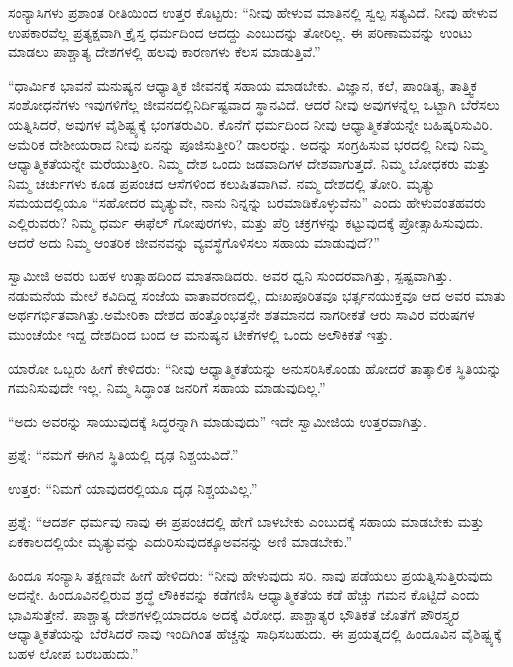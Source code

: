 ಸಂನ್ಯಾಸಿಗಳು ಪ್ರಶಾಂತ ರೀತಿಯಿಂದ ಉತ್ತರ ಕೊಟ್ಟರು: “ನೀವು ಹೇಳುವ ಮಾತಿನಲ್ಲಿ ಸ್ವಲ್ಪ ಸತ್ಯವಿದೆ. ನೀವು ಹೇಳುವ ಉಪಕಾರವೆಲ್ಲ ಪ್ರತ್ಯಕ್ಷವಾಗಿ ಕ್ರೈಸ್ತ ಧರ್ಮದಿಂದ ಆದದ್ದು ಎಂಬುದನ್ನು ತೋರಿಲ್ಲ. ಈ ಪರಿಣಾಮವನ್ನು ಉಂಟು ಮಾಡಲು ಪಾಶ್ಚಾತ್ಯ ದೇಶಗಳಲ್ಲಿ ಹಲವು ಕಾರಣಗಳು ಕೆಲಸ ಮಾಡುತ್ತಿವೆ.”

“ಧಾರ್ಮಿಕ ಭಾವನೆ ಮನುಷ್ಯನ ಆಧ್ಯಾತ್ಮಿಕ ಜೀವನಕ್ಕೆ ಸಹಾಯ ಮಾಡಬೇಕು. ವಿಜ್ಞಾನ, ಕಲೆ, ಪಾಂಡಿತ್ಯ, ತಾತ್ತ್ವಿಕ ಸಂಶೋಧನೆಗಳು ಇವುಗಳಿಗೆಲ್ಲ ಜೀವನದಲ್ಲಿ\break ನಿರ್ದಿಷ್ಟವಾದ ಸ್ಥಾನವಿದೆ. ಆದರೆ ನೀವು ಅವುಗಳನ್ನೆಲ್ಲ ಒಟ್ಟಾಗಿ ಬೆರೆಸಲು ಯತ್ನಿಸಿದರೆ, ಅವುಗಳ ವೈಶಿಷ್ಟ್ಯಕ್ಕೆ ಭಂಗತರುವಿರಿ. ಕೊನೆಗೆ ಧರ್ಮದಿಂದ ನೀವು ಆಧ್ಯಾತ್ಮಿಕತೆಯನ್ನೇ ಬಹಿಷ್ಕರಿಸುವಿರಿ. ಅಮೆರಿಕ ದೇಶೀಯರಾದ ನೀವು ಏನನ್ನು ಪೂಜಿಸುತ್ತೀರಿ? ಡಾಲರನ್ನು. ಅದನ್ನು ಸಂಗ್ರಹಿಸುವ ಭರದಲ್ಲಿ ನೀವು ನಿಮ್ಮ ಆಧ್ಯಾತ್ಮಿಕತೆಯನ್ನೇ ಮರೆಯುತ್ತೀರಿ. ನಿಮ್ಮ ದೇಶ ಒಂದು ಜಡವಾದಿಗಳ ದೇಶವಾಗುತ್ತದೆ. ನಿಮ್ಮ ಬೋಧಕರು ಮತ್ತು ನಿಮ್ಮ ಚರ್ಚುಗಳು ಕೂಡ ಪ್ರಪಂಚದ ಆಸೆಗಳಿಂದ ಕಲುಷಿತವಾಗಿವೆ. ನಮ್ಮ ದೇಶದಲ್ಲಿ ತೋರಿ. ಮೃತ್ಯು ಸಮಯದಲ್ಲಿಯೂ “ಸಹೋದರ ಮೃತ್ಯುವೇ, ನಾನು ನಿನ್ನನ್ನು ಬರಮಾಡಿಕೊಳ್ಳುವೆನು” ಎಂದು ಹೇಳುವಂತಹವರು ಎಲ್ಲಿರುವರು? ನಿಮ್ಮ ಧರ್ಮ ಈಫೆಲ್​ ಗೋಪುರಗಳು, ಮತ್ತು ಪೆರ್ರಿ ಚಕ್ರಗಳನ್ನು ಕಟ್ಟುವುದಕ್ಕೆ ಪ್ರೋತ್ಸಾಹಿಸುವುದು. ಆದರೆ ಅದು ನಿಮ್ಮ ಆಂತರಿಕ ಜೀವನವನ್ನು ವ್ಯವಸ್ಥೆಗೊಳಿಸಲು ಸಹಾಯ ಮಾಡುವುದೆ?”

\vskip 0.1cm

ಸ್ವಾಮೀಜಿ ಅವರು ಬಹಳ ಉತ್ಸಾಹದಿಂದ ಮಾತನಾಡಿದರು. ಅವರ ಧ್ವನಿ ಸುಂದರವಾಗಿತ್ತು, ಸ್ಪಷ್ಟವಾಗಿತ್ತು. ನಡುಮನೆಯ ಮೇಲೆ ಕವಿದಿದ್ದ ಸಂಜೆಯ ವಾತಾವರಣದಲ್ಲಿ, ದುಃಖಪೂರಿತವೂ ಭರ್ತ್ಸನಯುಕ್ತವೂ ಆದ ಅವರ ಮಾತು ಅರ್ಥಗರ್ಭಿತವಾಗಿತ್ತು.\break ಅಮೇರಿಕಾ ದೇಶದ ಹಂತ್ತೊಂಭತ್ತನೇ ಶತಮಾನದ ನಾಗರೀಕತೆ ಆರು ಸಾವಿರ ವರುಷಗಳ ಮುಂಚೆಯೇ ಇದ್ದ ದೇಶದಿಂದ ಬಂದ ಆ ಮನುಷ್ಯನ ಟೀಕೆಗಳಲ್ಲಿ ಒಂದು ಅಲೌಕಿಕತೆ ಇತ್ತು.

ಯಾರೋ ಒಬ್ಬರು ಹೀಗೆ ಕೇಳಿದರು: “ನೀವು ಆಧ್ಯಾತ್ಮಿಕತೆಯನ್ನು ಅನುಸರಿಸಿಕೊಂಡು ಹೋದರೆ ತಾತ್ಕಾಲಿಕ ಸ್ಥಿತಿಯನ್ನು ಗಮನಿಸುವುದೇ ಇಲ್ಲ. ನಿಮ್ಮ ಸಿದ್ಧಾಂತ ಜನರಿಗೆ ಸಹಾಯ ಮಾಡುವುದಿಲ್ಲ.”

“ಅದು ಅವರನ್ನು ಸಾಯುವುದಕ್ಕೆ ಸಿದ್ಧರನ್ನಾಗಿ ಮಾಡುವುದು” ಇದೇ ಸ್ವಾಮೀಜಿಯ ಉತ್ತರವಾಗಿತ್ತು.

ಪ್ರಶ್ನೆ: “ನಮಗೆ ಈಗಿನ ಸ್ಥಿತಿಯಲ್ಲಿ ದೃಢ ನಿಶ್ಚಯವಿದೆ.”

ಉತ್ತರ: “ನಿಮಗೆ ಯಾವುದರಲ್ಲಿಯೂ ದೃಢ ನಿಶ್ಚಯವಿಲ್ಲ.”

ಪ್ರಶ್ನೆ: “ಆದರ್ಶ ಧರ್ಮವು ನಾವು ಈ ಪ್ರಪಂಚದಲ್ಲಿ ಹೇಗೆ ಬಾಳಬೇಕು ಎಂಬುದಕ್ಕೆ ಸಹಾಯ ಮಾಡಬೇಕು ಮತ್ತು ಏಕಕಾಲದಲ್ಲಿಯೇ ಮೃತ್ಯುವನ್ನು ಎದುರಿಸುವುದಕ್ಕೂ\break ಅವನನ್ನು ಅಣಿ ಮಾಡಬೇಕು.”

ಹಿಂದೂ ಸಂನ್ಯಾಸಿ ತಕ್ಷಣವೇ ಹೀಗೆ ಹೇಳಿದರು: “ನೀವು ಹೇಳುವುದು ಸರಿ. ನಾವು ಪಡೆಯಲು ಪ್ರಯತ್ನಿಸುತ್ತಿರುವುದು ಅದನ್ನೇ. ಹಿಂದೂವಿನಲ್ಲಿರುವ ಶ್ರದ್ಧೆ ಲೌಕಿಕವನ್ನು ಕಡೆಗಣಿಸಿ ಆಧ್ಯಾತ್ಮಿಕತೆಯ ಕಡೆ ಹೆಚ್ಚು ಗಮನ ಕೊಟ್ಟಿದೆ ಎಂದು ಭಾವಿಸುತ್ತೇನೆ. ಪಾಶ್ಚಾತ್ಯ ದೇಶಗಳಲ್ಲಿಯಾದರೂ ಅದಕ್ಕೆ ವಿರೋಧ. ಪಾಶ್ಚಾತ್ಯರ ಭೌತಿಕತೆ ಜೊತೆಗೆ ಪೌರಸ್ತ್ಯರ ಆಧ್ಯಾತ್ಮಿಕತೆಯನ್ನು ಬೆರೆಸಿದರೆ ನಾವು ಇಂದಿಗಿಂತ ಹೆಚ್ಚನ್ನು ಸಾಧಿಸಬಹುದು. ಈ ಪ್ರಯತ್ನದಲ್ಲಿ ಹಿಂದೂವಿನ ವೈಶಿಷ್ಟ್ಯಕ್ಕೆ ಬಹಳ ಲೋಪ ಬರಬಹುದು.”


